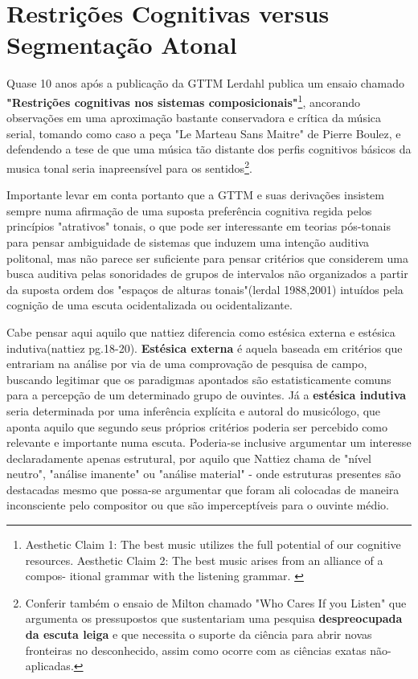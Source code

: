 \documentclass[
	12pt,				%
	openright,			%
	twoside,			%
	a4paper,			%
	english,			%
	french,				%
	spanish,			%
	brazil				%
	]{abntex2}
\begin{document}
\cite{temperley1999s}




\section{Restrições Cognitivas versus Segmentação Atonal}


Quase 10 anos após a publicação da GTTM Lerdahl publica um ensaio chamado \textbf{"Restrições cognitivas nos sistemas composicionais"}\cite{lerdahl1992cognitive}\footnote{
Aesthetic Claim 1: The best music utilizes the full potential of our
cognitive resources. Aesthetic Claim 2: The best music arises from an alliance of a compos-
itional grammar with the listening grammar. \cite{lerdahl1992cognitive}
}, ancorando observações em uma aproximação bastante conservadora e crítica da música serial, tomando como caso a peça "Le Marteau Sans Maitre" de Pierre Boulez, e defendendo a tese de que uma música tão distante dos perfis cognitivos básicos da musica tonal seria inapreensível para os sentidos\footnote{Conferir também o ensaio de Milton  chamado "Who Cares If you Listen" que argumenta os pressupostos que sustentariam uma pesquisa \textbf{despreocupada da escuta leiga} e que necessita o suporte da ciência para abrir novas fronteiras no desconhecido, assim como ocorre com as ciências exatas não-aplicadas. }. 

Importante levar em conta portanto que a GTTM e suas derivações insistem sempre numa afirmação de uma suposta preferência cognitiva regida pelos princípios "atrativos" tonais, o que pode ser interessante em teorias pós-tonais para pensar ambiguidade de sistemas que induzem uma intenção auditiva politonal, mas não parece ser suficiente para pensar critérios que considerem uma busca auditiva pelas sonoridades de grupos de intervalos não organizados a partir da suposta ordem dos "espaços de alturas tonais"(lerdal 1988,2001) intuídos pela cognição de uma escuta ocidentalizada ou ocidentalizante.

Cabe pensar aqui aquilo que nattiez diferencia como estésica externa e estésica indutiva(nattiez pg.18-20). \textbf{Estésica externa} é aquela baseada em critérios que entrariam na análise por via de uma comprovação de pesquisa de campo, buscando legitimar que os paradigmas apontados são estatisticamente comuns para a percepção de um determinado grupo de ouvintes. Já a \textbf{estésica indutiva} seria determinada por uma inferência explícita e autoral do musicólogo, que aponta aquilo que segundo seus próprios critérios poderia ser percebido como relevante e importante numa escuta. Poderia-se inclusive argumentar um interesse declaradamente apenas estrutural, por aquilo que Nattiez chama de "nível neutro", "análise imanente" ou "análise material" - onde estruturas presentes são destacadas mesmo que possa-se argumentar que foram ali colocadas de maneira inconsciente pelo compositor ou que são imperceptíveis para o ouvinte médio.
\end{document}
